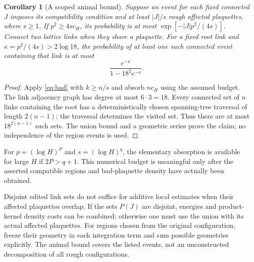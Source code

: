 \documentclass[11pt]{article}
\newtheorem{corollary}[theorem]{Corollary}
\theoremstyle{definition}
\theoremstyle{remark}
\begin{document}
\begin{corollary}[A scoped animal bound]\label{cor:animals}
Suppose an event for each fixed connected $J$ imposes its compatibility
condition and at least $|J|/s$ rough affected plaquettes, where $s\ge1$.
If $p^2\ge4s c_H$, its probability is at most
$\exp[-|J|p^2/(4s)]$.
Connect two lattice links when they share a plaquette. For a fixed root
link and $\kappa=p^2/(4s)>2\log18$, the probability of at least one such
connected event containing that link is at most
\[
 \frac{e^{-\kappa}}{1-18^2e^{-\kappa}}.
\]
\end{corollary}
\begin{proof}
Apply \eqref{eq:bad} with $k\ge n/s$ and absorb $nc_H$ using the
assumed budget. The link adjacency graph has degree at most $6\cdot3=18$.
Every connected set of $n$ links containing the root has a deterministically
chosen spanning-tree traversal of length $2(n-1)$; the traversal determines
the visited set. Thus there are at most $18^{2(n-1)}$ such sets.
The union bound and a geometric series prove the claim; no independence
of the region events is used.
\end{proof}
For $p=(\log H)^P$ and $s=(\log H)^q$, the elementary absorption is
available for large $H$ if $2P>q+1$. This numerical budget is meaningful
only after the asserted compatible regions and bad-plaquette density
have actually been obtained.

Disjoint edited link sets do not suffice for additive local estimates
when their affected plaquettes overlap. If the sets $P(J)$ are disjoint,
energies and product-kernel density costs can be combined; otherwise one
must use the union with its actual affected plaquettes. For regions
chosen from the original configuration, freeze their geometry in each
integration term and sum possible geometries explicitly. The animal
bound covers the listed events, not an unconstructed decomposition of
all rough configurations.
\end{document}
